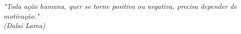 \begin{epigrafe}
    \vspace*{\fill}
	\begin{flushright}
		\textit{"Toda ação humana, quer se torne positiva ou negativa, precisa depender de motivação."\\
		(Dalai Lama)}
	\end{flushright}
\end{epigrafe}
